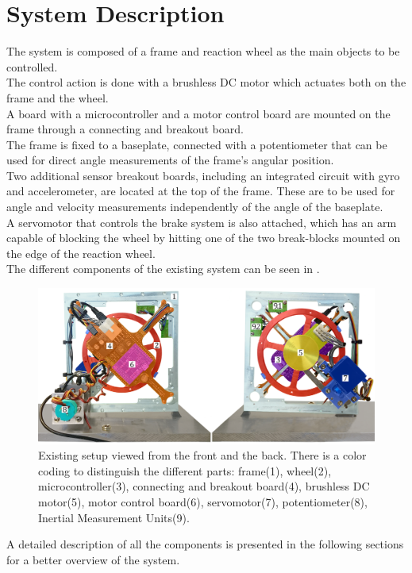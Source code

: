 \chapter{System Description}\label{systemDescription}
The system is composed of a frame and reaction wheel as the main objects to be controlled.\\
The control action is done with a brushless DC motor which actuates both on the frame and the wheel.\\ 
A board with a microcontroller and a motor control board are mounted on the frame through a connecting and breakout board.\\ 
The frame is fixed to a baseplate, connected with a potentiometer that can be used for direct angle measurements of the frame's angular position.\\ 
Two additional sensor breakout boards, including an integrated circuit with gyro and accelerometer, are located at the top of the frame. These are to be used for angle and velocity measurements independently of the angle of the baseplate.\\ 
A servomotor that controls the brake system is also attached, which has an arm capable of blocking the wheel by hitting one of the two break-blocks mounted on the edge of the reaction wheel.\\
The different components of the existing system can be seen in .
\\
\begin{figure}[H]
	\centering
	\includegraphics[scale=0.27]{figures/Cubli12}
	\caption{Existing setup viewed from the front and the back. There is a color coding to distinguish the different parts: frame(1), wheel(2), microcontroller(3), connecting and breakout board(4), brushless DC motor(5), motor control board(6), servomotor(7), potentiometer(8), Inertial Measurement Units(9).}
	\label{CubliParts}
\end{figure}
%
A detailed description of all the components is presented in the following sections for a better overview of the system.

